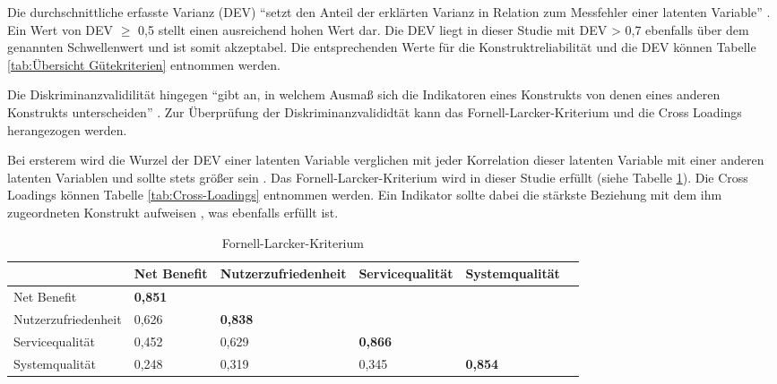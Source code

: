 Die durchschnittliche erfasste Varianz (DEV) "`setzt den Anteil der erklärten Varianz in Relation zum Messfehler einer latenten Variable"'  \parencite[S.25]{nitzl2010anwenderorientierte}. Ein Wert von DEV $\geq$ 0,5 stellt einen ausreichend hohen Wert dar. Die DEV liegt in dieser Studie mit DEV > 0,7 ebenfalls über dem genannten Schwellenwert und ist somit akzeptabel. Die entsprechenden Werte für die Konstruktreliabilität und die DEV können Tabelle \ref{tab:Übersicht Gütekriterien} entnommen werden. 

Die Diskriminanzvalidilität hingegen "`gibt an, in welchem Ausmaß sich die Indikatoren eines Konstrukts von denen eines anderen Konstrukts unterscheiden"' \parencite[S.26]{nitzl2010anwenderorientierte}. Zur Überprüfung der Diskriminanzvalididtät kann das Fornell-Larcker-Kriterium und die Cross Loadings herangezogen werden.




Bei ersterem wird die Wurzel der DEV einer latenten Variable verglichen mit jeder Korrelation dieser latenten Variable mit einer anderen latenten Variablen und sollte stets größer sein \parencite[vgl.][S.26]{nitzl2010anwenderorientierte}. Das Fornell-Larcker-Kriterium wird in dieser Studie erfüllt (siehe Tabelle \ref{tab:Fornell-Larcker-Kriterium}). Die Cross Loadings können Tabelle \ref{tab:Cross-Loadings} entnommen werden. Ein Indikator sollte dabei die stärkste Beziehung mit dem ihm zugeordneten Konstrukt aufweisen \parencite[vgl.][S.26]{nitzl2010anwenderorientierte}, was ebenfalls erfüllt ist.   \nocite{fornell1981evaluating}


\begin{table}[h] 
\footnotesize
\caption{Fornell-Larcker-Kriterium}
\label{tab:Fornell-Larcker-Kriterium} 
\begin{tabular}{@{}llllll@{}} \toprule

 & \textbf{Net Benefit} & \textbf{Nutzerzufriedenheit} & \textbf{Servicequalität} & \textbf{Systemqualität} \\ \midrule

 Net Benefit 			& \textbf{0,851}		& 			& 		&  		\\
 
 Nutzerzufriedenheit 	& 0,626 		& \textbf{0,838}		& 		& 			\\

 Servicequalität 		& 0,452 		& 0,629 		& \textbf{0,866}	& 		 \\

 Systemqualität 		& 0,248 		& 0,319 		& 0,345 	& \textbf{0,854} \\ 
 
 \bottomrule
\end{tabular}	
\end{table}






